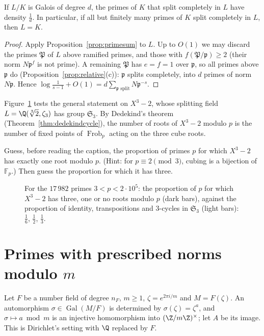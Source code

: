 \begin{theorem}[Kronecker, 1880]\label{thm:kronecker}
If $L/K$ is Galois of degree $d$, the primes of $K$ that split completely in $L$ have density $\frac1d$. In particular, if all but finitely many
primes of $K$ split completely in $L$, then $L=K$.
\end{theorem}
\begin{proof}
Apply Proposition~\ref{prop:primesum} to $L$. Up to $O(1)$ we may discard the primes $\mathfrak P$ of $L$ above ramified primes, and those with
$f(\mathfrak P/\mathfrak p)\ge2$ (their norm $N\mathfrak p^f$ is not prime). A remaining $\mathfrak P$ has $e=f=1$ over $\mathfrak p$, so all
primes above $\mathfrak p$ do (Proposition~\ref{prop:relative}(c)): $\mathfrak p$ splits completely, into $d$ primes of norm $N\mathfrak p$.
Hence $\log\frac1{s-1}+O(1)=d\sum_{\mathfrak p\text{ split}}N\mathfrak p^{-s}$.
\end{proof}

Figure~\ref{fig:cubefrob} tests the general statement on $X^3-2$, whose splitting field $L=\Q(\sqrt[3]2,\zeta_3)$ has group $\mathfrak S_3$. By
Dedekind's theorem (Theorem~\ref{thm:dedekindcycle}), the number of roots of $X^3-2$ modulo $p$ is the number of fixed points of
$\operatorname{Frob}_p$ acting on the three cube roots.

\begin{think}
Guess, before reading the caption, the proportion of primes $p$ for which $X^3-2$ has exactly one root modulo $p$. (Hint: for $p\equiv2\pmod3$,
cubing is a bijection of $\mathbb F_p$.) Then guess the proportion for which it has three.
\end{think}

\begin{figure}[ht]
\centering
{}
\caption{For the $17\,982$ primes $3<p<2\cdot10^5$: the proportion of $p$ for which $X^3-2$ has three, one or no roots modulo $p$ (dark bars),
against the proportion of identity, transpositions and $3$-cycles in $\mathfrak S_3$ (light bars): $\frac16$, $\frac12$, $\frac13$.}
\label{fig:cubefrob}
\end{figure}

\section{Primes with prescribed norms modulo \texorpdfstring{$m$}{m}}

Let $F$ be a number field of degree $n_F$, $m\ge1$, $\zeta=e^{2\pi i/m}$ and $M=F(\zeta)$. An automorphism $\sigma\in\operatorname{Gal}(M/F)$ is
determined by $\sigma(\zeta)=\zeta^a$, and $\sigma\mapsto a\bmod m$ is an injective homomorphism into $(\Z/m\Z)^\times$; let $A$ be its image.
This is Dirichlet's setting with $\Q$ replaced by $F$.

